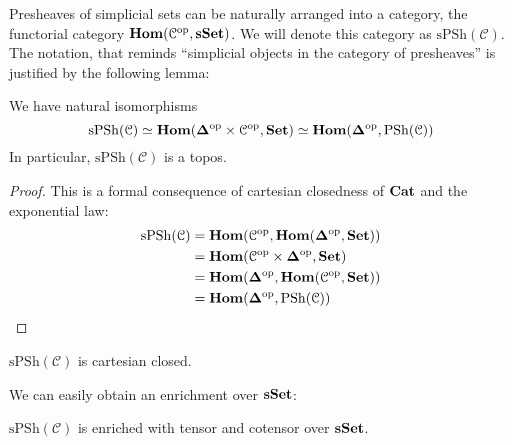 \begin{refsection}
Presheaves of simplicial sets can be naturally arranged into a category, the functorial category $\mathbf{Hom}(\mathcal C^{\mathrm{op}}, \mathbf{sSet})$. We will denote this category as $\mathrm{sPSh}(\mathcal C)$. The notation, that reminds ``simplicial objects in the category of presheaves'' is justified by the following lemma:

\begin{lemma} \label{lemma simplicial presheaves}
We have natural isomorphisms
\[
\mathrm{sPSh}(\mathcal C) \simeq \mathbf{Hom}(\mathbf \Delta^{\mathrm{op}} \times \mathcal C^{\mathrm{op}}, \mathbf{Set}) \simeq \mathbf{Hom}(\mathbf \Delta^{\mathrm{op}}, \mathrm{PSh}(\mathcal C))
\]
In particular, $\mathrm{sPSh}(\mathcal C)$ is a topos.
\end{lemma}

\begin{proof}
This is a formal consequence of cartesian closedness of $\mathbf{Cat}$ and the exponential law:
\begin{align*}
\mathrm{sPSh}(\mathcal C) & = \mathbf{Hom}(\mathcal C^{\mathrm{op}}, \mathbf{Hom}(\mathbf \Delta^{\mathrm{op}}, \mathbf{Set})) \\
& = \mathbf{Hom}(\mathcal C^{\mathrm{op}} \times \mathbf \Delta^{\mathrm{op}}, \mathbf{Set}) \\
& = \mathbf{Hom}(\mathbf \Delta^{\mathrm{op}}, \mathbf{Hom}(\mathcal C^{\mathrm{op}}, \mathbf{Set})) \\
& = \mathbf{Hom}(\mathbf \Delta^{\mathrm{op}}, \mathrm{PSh}(\mathcal C))
\end{align*}
\end{proof}

\begin{cor}
$\mathrm{sPSh}(\mathcal C)$ is cartesian closed.
\end{cor}

We can easily obtain an enrichment over $\mathbf{sSet}$:

\begin{prop} \label{prop enriched simplicial presheaves}
$\mathrm{sPSh}(\mathcal C)$ is enriched with tensor and cotensor over $\mathbf{sSet}$.
\end{prop}


\end{refsection}
